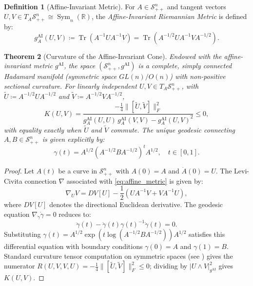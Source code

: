 \documentclass[11pt,a4paper,reqno]{amsart}
\newtheorem{theorem}{Theorem}[section]
\theoremstyle{definition}
\newtheorem{definition}[theorem]{Definition}
\numberwithin{equation}{section}
\providecommand{\R}{\mathbb{R}}
\newcommand{\Tr}{\operatorname{Tr}}
\providecommand{\R}{\mathbb{R}}
\begin{document}
\begin{definition}[Affine-Invariant Metric]
For $A \in \mathcal{S}_{++}^n$ and tangent vectors $U, V \in T_A \mathcal{S}_{++}^n \cong \operatorname{Sym}_n(\R)$, the \emph{Affine-Invariant Riemannian Metric} is defined by:
\begin{equation}
    \label{eq:affine_metric}
    g_A^{\mathrm{AI}}(U, V) \coloneqq \Tr\left( A^{-1} U A^{-1} V \right) = \Tr\left( A^{-1/2} U A^{-1} V A^{-1/2} \right).
\end{equation}
\end{definition}

\begin{theorem}[Curvature of the Affine-Invariant Cone]
\label{thm:cone_curvature}
Endowed with the affine-invariant metric $g^{\mathrm{AI}}$, the space $(\mathcal{S}_{++}^n, g^{\mathrm{AI}})$ is a complete, simply connected Hadamard manifold (symmetric space $GL(n)/O(n)$) with non-positive sectional curvature. For linearly independent $U, V \in T_A \mathcal{S}_{++}^n$, with $\tilde U \coloneqq A^{-1/2} U A^{-1/2}$ and $\tilde V \coloneqq A^{-1/2} V A^{-1/2}$,
\begin{equation}
    K(U, V) = \frac{-\frac{1}{4} \|[\tilde U, \tilde V]\|_F^2}{g^{\mathrm{AI}}_A(U,U)\, g^{\mathrm{AI}}_A(V,V) - g^{\mathrm{AI}}_A(U,V)^2} \le 0,
\end{equation}
with equality exactly when $\tilde U$ and $\tilde V$ commute.
The unique geodesic connecting $A, B \in \mathcal{S}_{++}^n$ is given explicitly by:
\begin{equation}
    \label{eq:cone_geodesic}
    \gamma(t) = A^{1/2} \left( A^{-1/2} B A^{-1/2} \right)^t A^{1/2}, \quad t \in [0, 1].
\end{equation}
\end{theorem}
\begin{proof}
Let $A(t)$ be a curve in $\mathcal{S}_{++}^n$ with $A(0) = A$ and $\dot{A}(0) = U$. The Levi-Civita connection $\nabla$ associated with \eqref{eq:affine_metric} is given by:
\begin{equation}
    \nabla_U V = D V[U] - \frac{1}{2}(U A^{-1} V + V A^{-1} U),
\end{equation}
where $D V[U]$ denotes the directional Euclidean derivative. The geodesic equation $\nabla_{\dot{\gamma}} \dot{\gamma} = 0$ reduces to:
\begin{equation}
    \ddot{\gamma}(t) - \dot{\gamma}(t) \gamma(t)^{-1} \dot{\gamma}(t) = 0.
\end{equation}
Substituting $\gamma(t) = A^{1/2} \exp(t \log(A^{-1/2} B A^{-1/2})) A^{1/2}$ satisfies this differential equation with boundary conditions $\gamma(0) = A$ and $\gamma(1) = B$. Standard curvature tensor computation on symmetric spaces (see \cite{bhatia2009positive}) gives the numerator $R(U,V,V,U) = -\frac{1}{4} \|[\tilde U, \tilde V]\|_F^2 \le 0$; dividing by $|U \wedge V|^2_{g^{\mathrm{AI}}}$ gives $K(U,V)$.
\end{proof}
\end{document}
